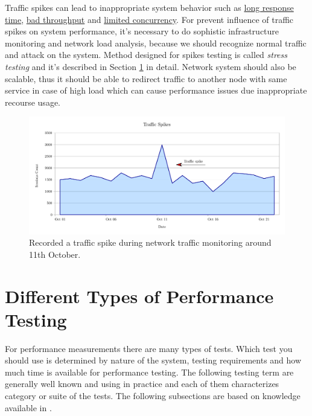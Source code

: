Traffic spikes can lead to inappropriate system behavior such as \underline{long response time}, \underline{bad throughput} and \underline{limited concurrency}. For prevent influence of traffic spikes on system performance, it's  necessary to do sophistic infrastructure monitoring and network load analysis, because we should recognize normal traffic and attack on the system. Method designed for spikes testing is called \emph{stress testing} \cite{Manzor:APTB} and it's described in Section \ref{Different Types of Performance Testing} in detail. Network system should also be scalable, thus it should be able to redirect traffic to another node with same service in case of high load which can cause performance issues due inappropriate recourse usage.

\begin{figure}[H]
  \centering
  \includegraphics[width=14cm]{obrazky-figures/traffic-spikes.pdf}
  \caption{Recorded a traffic spike during network traffic monitoring around 11th October.}
  \label{fig:spikes}
\end{figure}

\section{Different Types of Performance Testing}
\label{Different Types of Performance Testing}

For performance measurements there are many types of tests. Which test you should use is determined by nature of the system, testing requirements and how much time is available for performance testing. The following testing term are generally well known and using in practice and each of them characterizes category or suite of the tests. The following subsections are based on knowledge available in \cite{TuPo:TESTS, BUCH:4TYPES, Molyneaux:TAoAPT}.

